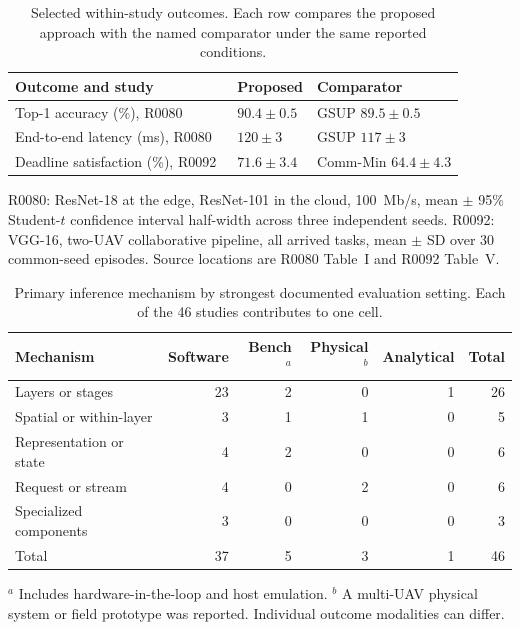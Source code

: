 \documentclass[pdflatex,sn-vancouver-num]{sn-jnl}
\begin{document}
\begin{table}[tb]
\caption{Selected within-study outcomes. Each row compares the proposed approach with the named comparator under the same reported conditions.}\label{tab:outcomes}
\centering\small
\begin{tabular}{@{}p{.42\linewidth}ll@{}}
\toprule
Outcome and study & Proposed & Comparator \\
\midrule
Top-1 accuracy (\%), R0080~\cite{R0080} & $90.4\pm0.5$ & GSUP $89.5\pm0.5$ \\
End-to-end latency (ms), R0080~\cite{R0080} & $120\pm3$ & GSUP $117\pm3$ \\
Deadline satisfaction (\%), R0092~\cite{R0092} & $71.6\pm3.4$ & Comm-Min $64.4\pm4.3$ \\
\bottomrule
\end{tabular}
\par\smallskip\raggedright R0080: ResNet-18 at the edge, ResNet-101 in the cloud, 100~Mb/s, mean $\pm$ 95\% Student-$t$ confidence interval half-width across three independent seeds. R0092: VGG-16, two-UAV collaborative pipeline, all arrived tasks, mean $\pm$ SD over 30 common-seed episodes. Source locations are R0080 Table~I and R0092 Table~V.
\end{table}

\begin{table}[tb]
\caption{Primary inference mechanism by strongest documented evaluation setting. Each of the 46 studies contributes to one cell.}\label{tab:settings}
\centering\small
\begin{tabular}{@{}p{.32\linewidth}rrrrr@{}}
\toprule
Mechanism & Software & Bench$^{a}$ & Physical$^{b}$ & Analytical & Total\\
\midrule
Layers or stages & 23 & 2 & 0 & 1 & 26\\
Spatial or within-layer & 3 & 1 & 1 & 0 & 5\\
Representation or state & 4 & 2 & 0 & 0 & 6\\
Request or stream & 4 & 0 & 2 & 0 & 6\\
Specialized components & 3 & 0 & 0 & 0 & 3\\
\midrule
Total & 37 & 5 & 3 & 1 & 46\\
\bottomrule
\end{tabular}
\par\smallskip\raggedright $^{a}$ Includes hardware-in-the-loop and host emulation.
$^{b}$ A multi-UAV physical system or field prototype was reported. Individual outcome modalities can differ.
\end{table}
\end{document}
